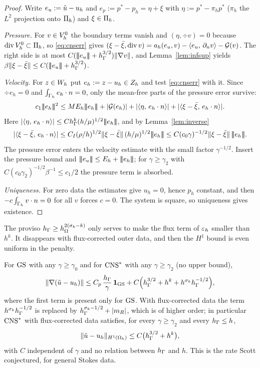 \begin{proof}
Write $e_u:=\tilde u-u_h$ and $e_p:=p^\ast-p_h=\eta+\xi$ with $\eta:=p^\ast-\pi_hp^\ast$ ($\pi_h$ the $L^2$ projection onto $\Pi_h$) and $\xi\in\Pi_h$.

\emph{Pressure.} For $v\in V_h^0$ the boundary terms vanish and $(\eta,\div v)=0$ because $\operatorname{div}V_h^0\subset\Pi_h$, so \eqref{eq:cnserr} gives $(\xi-\bar\xi,\operatorname{div} v)=a_h(e_u,v)-\langle e_u,\, \partial_n v\rangle-\mathcal G(v)$. The right side is at most $C(|\!|\!|e_u|\!|\!|+h_\Gamma^{3/2})\lVert \nabla v\rVert$, and Lemma~\ref{lem:infsup} yields $\beta\lVert \xi-\bar\xi\rVert\le C(|\!|\!|e_u|\!|\!|+h_\Gamma^{3/2})$.

\emph{Velocity.} For $z\in W_h$ put $e_h:=z-u_h\in Z_h$ and test \eqref{eq:cnserr} with it. Since $\div e_h=0$ and $\int_{\Gamma_h}e_h\cdot n=0$, only the mean-free parts of the pressure error survive:
\[
c_1\tnorm{e_h}^2\le ME_h\tnorm{e_h}+|\Gc(e_h)|+|\ip{\eta}{e_h\cdot n}|+|\ip{\xi-\bar\xi}{e_h\cdot n}| .
\]
Here $|\langle \eta,\, e_h\cdot n\rangle|\le Ch_\Gamma^k(h/\mu)^{1/2}|\!|\!|e_h|\!|\!|$, and by Lemma~\ref{lem:inverse}
\[
|\ip{\xi-\bar\xi}{e_h\cdot n}|\le C_I(\rho/h)^{1/2}\norm{\xi-\bar\xi}\,(h/\mu)^{1/2}\tnorm{e_h}\le C(c_0\gamma)^{-1/2}\norm{\xi-\bar\xi}\,\tnorm{e_h}.
\]
The pressure error enters the velocity estimate with the small factor $\gamma^{-1/2}$. Insert the pressure bound and $\tnorm{e_u}\le E_h+\tnorm{e_h}$; for $\gamma\ge\gamma_2$ with $C(c_0\gamma_2)^{-1/2}\beta^{-1}\le c_1/2$ the pressure term is absorbed.

\emph{Uniqueness.} For zero data the estimates give $u_h=0$, hence $p_h$ constant, and then $-c\int_{\Gamma_h}v\cdot n=0$ for all $v$ forces $c=0$. The system is square, so uniqueness gives existence.
\end{proof}

The proviso $h_\Gamma\ge h_\Omega^{2(\sigma_k-k)}$ only serves to make the flux term of $\varepsilon_h$ smaller than $h^k$. It disappears with flux-corrected outer data, and then the $H^1$ bound is even uniform in the penalty.

\begin{theorem}\label{thm:unif}
For $\mathrm{GS}$ with any $\gamma\ge\gamma_0$ and for $\mathrm{CNS}^\ast$ with any $\gamma\ge\gamma_2$ (no upper bound),
\[
\lVert \nabla(\tilde u-u_h)\rVert\le C_p\,\frac{h_\Gamma}{\gamma}\,\mathbf 1_{\mathrm{GS}}+C\Bigl(h_\Gamma^{3/2}+h^k+h^{\sigma_k}h_\Gamma^{-1/2}\Bigr),
\]
where the first term is present only for $\mathrm{GS}$. With flux-corrected data the term $h^{\sigma_k}h_\Gamma^{-1/2}$ is replaced by $h_\Gamma^{\sigma_k-1/2}+|m_R|$, which is of higher order; in particular $\mathrm{CNS}^\ast$ with flux-corrected data satisfies, for every $\gamma\ge\gamma_2$ and every $h_\Gamma\le h$,
\[
\lVert \tilde u-u_h\rVert_{H^1(\Omega_h)}\le C\bigl(h_\Gamma^{3/2}+h^k\bigr),
\]
with $C$ independent of $\gamma$ and no relation between $h_\Gamma$ and $h$. This is the rate Scott conjectured, for general Stokes data.
\end{theorem}

